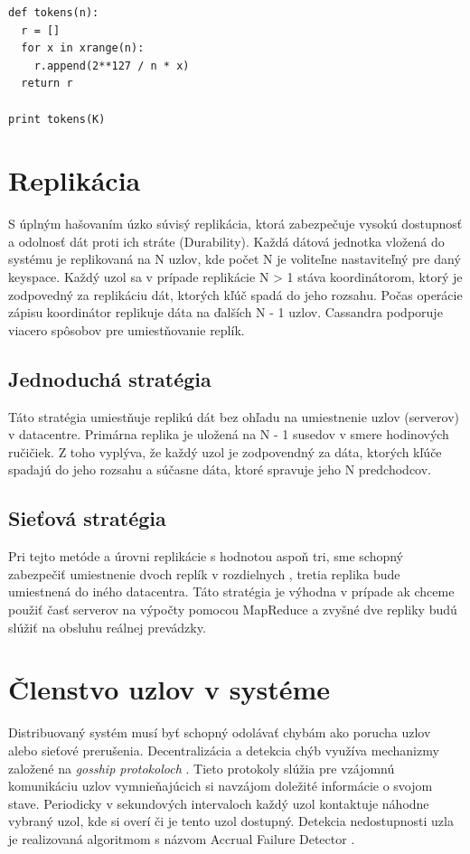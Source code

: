 \documentclass[11pt,twoside,a4paper]{book}
\begin{document}
\begin{verbatim}
def tokens(n):
  r = []
  for x in xrange(n):
    r.append(2**127 / n * x)
  return r

print tokens(K)
\end{verbatim}




\section{Replikácia}

S úplným hašovaním úzko súvisý replikácia, ktorá zabezpečuje vysokú dostupnosť a odolnosť dát proti ich stráte (Durability). Každá dátová jednotka vložená do systému je replikovaná na N uzlov, kde počet N je voliteľne nastaviteľný pre daný keyspace. Každý uzol sa v prípade replikácie N > 1 stáva koordinátorom, ktorý je zodpovedný za replikáciu dát, ktorých kľúč spadá do jeho rozsahu. Počas operácie zápisu koordinátor replikuje dáta na ďalších N - 1 uzlov. Cassandra podporuje viacero spôsobov pre umiestňovanie replík.

\subsection*{Jednoduchá stratégia}

Táto stratégia umiestňuje replikú dát bez ohľadu na umiestnenie uzlov (serverov) v datacentre. Primárna replika je uložená na N - 1 susedov v smere hodinových ručičiek. Z toho vyplýva, že každý uzol je zodpovendný za dáta, ktorých kľúče spadajú do jeho rozsahu a súčasne dáta, ktoré spravuje jeho N predchodcov.

\subsection*{Sieťová stratégia}

Pri tejto metóde a úrovni replikácie s hodnotou aspoň tri, sme schopný zabezpečiť umiestnenie dvoch replík v rozdielnych , tretia replika bude umiestnená do iného datacentra. Táto stratégia je výhodna v prípade ak chceme použiť časť serverov na výpočty pomocou MapReduce a zvyšné dve repliky budú slúžiť na obsluhu reálnej prevádzky.

\section{Členstvo uzlov v systéme}

Distribuovaný systém musí byť schopný odolávať chybám ako porucha uzlov alebo sieťové prerušenia. Decentralizácia a detekcia chýb využíva mechanizmy založené na \emph{gosship protokoloch} \cite{ganesh2003peer}. Tieto protokoly slúžia pre vzájomnú komunikáciu uzlov vymnieňajúcich si navzájom doležité informácie o svojom stave. Periodicky v sekundových intervaloch každý uzol kontaktuje náhodne vybraný uzol, kde si overí či je tento uzol dostupný. Detekcia nedostupnosti uzla je realizovaná algoritmom s názvom Accrual Failure Detector \cite{hayashibara2004}.
\end{document}
